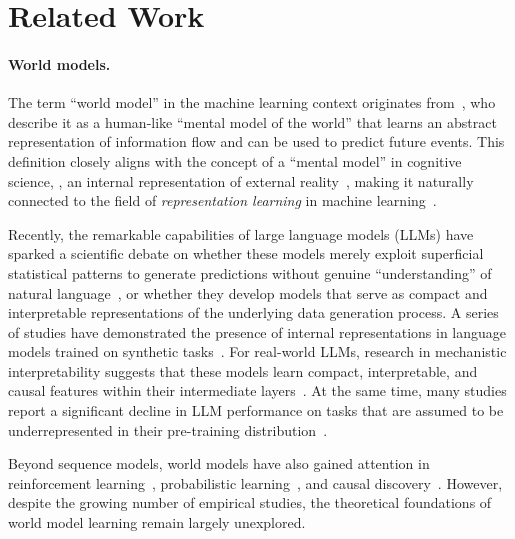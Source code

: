 \section{Related Work}
\label{appsec:related_work}

\paragraph{World models.} 
The term “world model” in the machine learning context originates from~\citet{ha_world_2018}, who describe it as a human-like “mental model of the world” that learns an abstract representation of information flow and can be used to predict future events. This definition closely aligns with the concept of a “mental model” in cognitive science, \ie, an internal representation of external reality~\citep{craik1967nature}, making it naturally connected to the field of \emph{representation learning} in machine learning~\citep{bengio_representation_2013}.

Recently, the remarkable capabilities of large language models (LLMs) have sparked a scientific debate on whether these models merely exploit superficial statistical patterns to generate predictions without genuine “understanding” of natural language~\citep{bender_dangers_2021,mitchell_ai_2023}, or whether they develop models that serve as compact and interpretable representations of the underlying data generation process. A series of studies have demonstrated the presence of internal representations in language models trained on synthetic tasks~\citep{li_emergent_2023,nanda_emergent_2023,jin_emergent_2024}. For real-world LLMs, research in mechanistic interpretability suggests that these models learn compact, interpretable, and causal features within their intermediate layers~\citep{li2021implicit,bricken2023towards,marks_geometry_2023,gurnee_language_2024}. At the same time, many studies report a significant decline in LLM performance on tasks that are assumed to be underrepresented in their pre-training distribution~\citep{wu_reasoning_2023,berglund_reversal_2024,mirzadeh_gsm-symbolic_2024}.

Beyond sequence models, world models have also gained attention in reinforcement learning~\citep{ha_world_2018,lecun2022path,xie_making_2024}, probabilistic learning~\citep{friston2021world,wong_word_2023}, and causal discovery~\citep{richensrobust}. However, despite the growing number of empirical studies, the theoretical foundations of world model learning remain largely unexplored.

